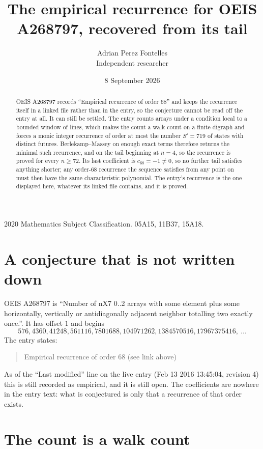 \documentclass[11pt,a4paper]{article}
\title{The empirical recurrence for OEIS A268797, recovered from its tail}
\author{Adrian Perez Fontelles\\ \small Independent researcher}
\date{8 September 2026}
\theoremstyle{plain}
\theoremstyle{definition}
\begin{document}
\maketitle

\begin{abstract}
OEIS A268797 records ``Empirical recurrence of order $68$'' and keeps the recurrence itself in
a linked file rather than in the entry, so the conjecture cannot be read off the entry at all.
It can still be settled. The entry counts arrays under a condition local to a bounded window of
lines, which makes the count a walk count on a finite digraph and forces a monic integer
recurrence of order at most the number $S'=719$ of states with distinct futures. Berlekamp--Massey on
enough exact terms therefore returns the minimal such recurrence, and on the tail beginning at $n=4$, so the recurrence is proved for every $n\ge72$.
Its last coefficient is $c_{68}=-1\neq0$, so no further tail satisfies anything
shorter; any order-$68$ recurrence the sequence satisfies from any point on must then have
the same characteristic polynomial. The entry's recurrence is the one displayed here, whatever
its linked file contains, and it is proved.
\end{abstract}

\noindent\small 2020 Mathematics Subject Classification. 05A15, 11B37, 15A18.\normalsize

\section{A conjecture that is not written down}

OEIS A268797 is ``Number of nX7 0..2 arrays with some element plus some horizontally, vertically or antidiagonally adjacent neighbor totalling two exactly once.''. It has offset $1$ and begins
\[
576, 4360, 41248, 561116, 7801688, 104971262, 1384570516, 17967375416,\ \dots
\]
The entry states:
\begin{quote}
Empirical recurrence of order 68 (see link above)
\end{quote}
As of the ``Last modified'' line on the live entry (Feb 13 2016 13:45:04, revision 4)
this is still recorded as empirical, and it is still open. The coefficients are nowhere in the
entry text: what is conjectured is only that a recurrence of that order exists.

\section{The count is a walk count}
\end{document}
